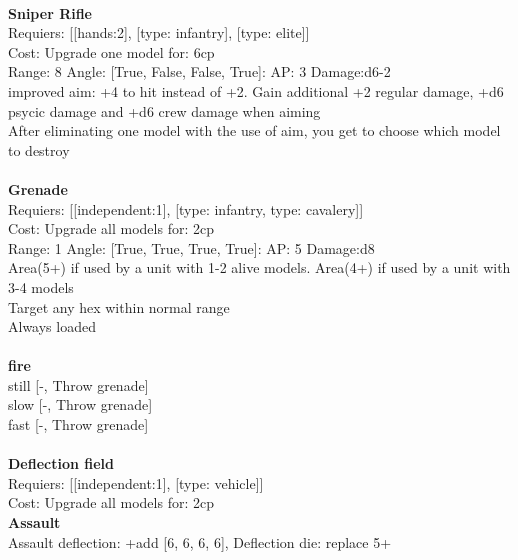\ \\
{\bf Sniper Rifle } \\

Requiers: [[hands:2], [type: infantry], [type: elite]] \\
Cost: Upgrade one model for: 6cp \\


Range: 8  Angle: [True, False, False, True]: AP: 3 Damage:d6-2 \\
improved aim: +4 to hit instead of +2. Gain additional +2 regular damage, +d6 psycic damage and +d6 crew damage when aiming\\ 
After eliminating one model with the use of aim, you get to choose which model to destroy\\ 








\ \\
{\bf Grenade } \\

Requiers: [[independent:1], [type: infantry, type: cavalery]] \\
Cost: Upgrade all models for: 2cp \\


Range: 1  Angle: [True, True, True, True]: AP: 5 Damage:d8 \\
Area(5+) if used by a unit with 1-2 alive models. Area(4+) if used by a unit with 3-4 models\\ 
Target any hex within normal range\\ 
Always loaded\\ 







\ \\ {\bf fire } \\
still [-, Throw grenade] \\
slow [-, Throw grenade] \\
fast [-, Throw grenade] \\

\ \\
{\bf Deflection field } \\

Requiers: [[independent:1], [type: vehicle]] \\
Cost: Upgrade all models for: 2cp \\




{\bf Assault} \ \\
Assault deflection: +add [6, 6, 6, 6], Deflection die: replace 5+
\\ 




